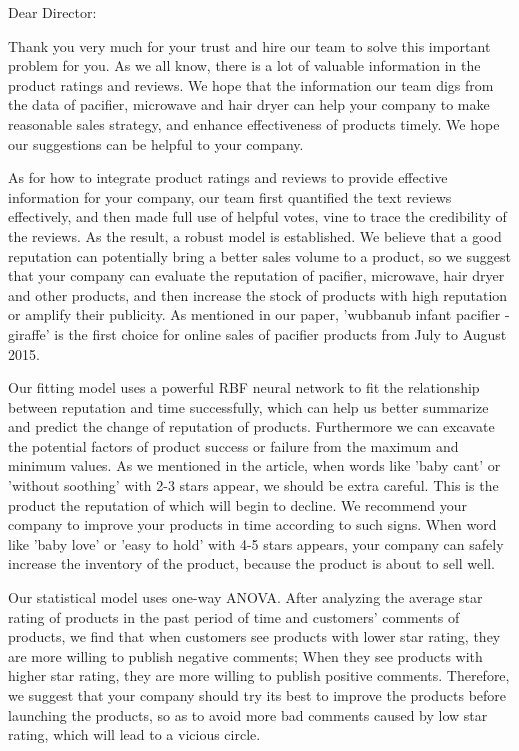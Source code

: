 \documentclass{mcmthesis}
\begin{document}
\newpage
\begin{memo}
\noindent Dear Director:

Thank you very much for your trust and hire our team to solve this important problem for you. As we all know, there is a lot of valuable information in the product ratings and reviews. We hope that the information our team digs from the data of pacifier, microwave and hair dryer can help your company to make reasonable sales strategy, and enhance effectiveness of products timely. We hope our suggestions can be helpful to your company. 

%
As for how to integrate product ratings and reviews to provide effective information for your company, our team first quantified the text reviews effectively, and then made full use of helpful votes, vine to trace the credibility of the reviews. As the result, a robust model is established. We believe that a good reputation can potentially bring a better sales volume to a product, so we suggest that your company can evaluate the reputation of pacifier, microwave, hair dryer and other products, and then increase the stock of products with high reputation or amplify their publicity. As mentioned in our paper, 'wubbanub infant pacifier - giraffe' is the first choice for online sales of pacifier products from July to August 2015.

Our fitting model uses a powerful RBF neural network to fit the relationship between reputation and time successfully, which can help us better summarize and predict the change of reputation of products. Furthermore we can excavate the potential factors of product success or failure from the maximum and minimum values. As we mentioned in the article, when words like 'baby cant' or 'without soothing' with 2-3 stars appear, we should be extra careful. This is the product the reputation of which  will begin to decline. We recommend your company to improve your products in time according to such signs. When word like 'baby love' or 'easy to hold' with 4-5 stars appears, your company can safely increase the inventory of the product, because the product is about to sell well.

Our statistical model uses one-way ANOVA. After analyzing the average star rating of products in the past period of time and customers' comments of products, we find that when customers see products with lower star rating, they are more willing to publish negative comments; When they see products with higher star rating, they are more willing to publish positive comments. Therefore, we suggest that your company should try its best to improve the products before launching the products, so as to avoid more bad comments caused by low star rating, which will lead to a vicious circle.


\end{memo}
\end{document}

